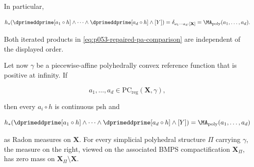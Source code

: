 \begin{proposition}
In particular,

\begin{equation}
 h_*\!\left(
   \dprimeddprime[a_1\circ h]\wedge\cdots\wedge
   \dprimeddprime[a_d\circ h]\wedge[Y]
 \right)
 =\delta_{a_1\cdots a_d\cdot[\mathbf X]}
 =\MA_{\mathrm{poly}}(a_1,\ldots,a_d).
 \label{eq:p053-repaired-pa-comparison}
\end{equation}

Both iterated products in \eqref{eq:p053-repaired-pa-comparison} are
independent of the displayed order.

Let now \(\gamma\) be a piecewise-affine polyhedrally convex reference
function that is positive at infinity.  If

\[
 a_1,\ldots,a_d\in\mathrm{PC}_{\mathrm{reg}}(\mathbf X,\gamma),
\]

then every \(a_i\circ h\) is continuous psh and

\begin{equation}
 h_*\!\left(
   \dprimeddprime[a_1\circ h]\wedge\cdots\wedge
   \dprimeddprime[a_d\circ h]\wedge[Y]
 \right)
 =\MA_{\mathrm{poly}}(a_1,\ldots,a_d)
 \label{eq:p053-repaired-regularizable-comparison}
\end{equation}

as Radon measures on \(\mathbf X\).  For every simplicial polyhedral
structure \(\Pi\) carrying \(\gamma\), the measure on the right, viewed on
the associated BMPS compactification \(\mathbf X_\Pi\), has zero mass on
\(\mathbf X_\Pi\setminus\mathbf X\).
\end{proposition}

